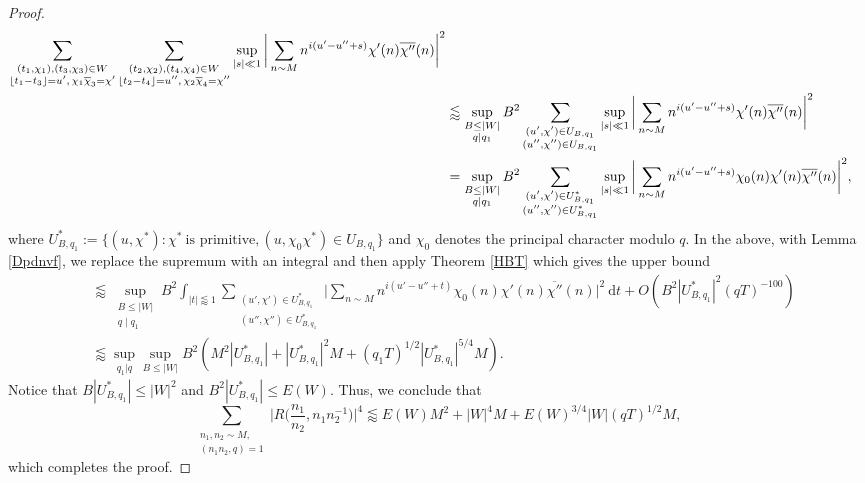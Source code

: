 \documentclass[12pt]{amsart}
\theoremstyle{definition}
\theoremstyle{plain}
\theoremstyle{remark}
\numberwithin{equation}{section}
\numberwithin{theorem}{section}
\numberwithin{equation}{section}
\begin{document}
\begin{proof}
\begin{align}
			\sum_{\substack{(t_{1}, \chi_{1}), (t_{3}, \chi_{3}) \in W \\ \lfloor t_{1}-t_{3} \rfloor =u', \, \chi_{1}\overline{\chi}_{3}=\chi'}}
			\sum_{\substack{(t_{2}, \chi_{2}), (t_{4}, \chi_{4}) \in W \\ \lfloor t_{2}-t_{4} \rfloor =u'', \, \chi_{2}\overline{\chi}_{4}=\chi''}}
			\sup_{|s|\ll 1}
			\bigg|\sum_{n \sim M} n^{i(u'-u''+s)}\chi'(n)\overline{\chi''}(n)\bigg|^{2} \notag
			\\
			&\lessapprox  \sup_{\substack{B \leq |W| \\ q \mid q_1}}B^{2}\sum_{\substack{(u' , \chi') \in U_{B, q_{1}} \\ (u'', \chi'')\in U_{B, q_{1}}}}
			\sup_{|s|\ll 1}
			\bigg|\sum_{n \sim M} n^{i(u'-u''+s)}\chi'(n)\overline{\chi''}(n)\bigg|^{2} \notag
			\\
			&=  \sup_{\substack{B \leq |W| \\ q \mid q_1}}B^{2}\sum_{\substack{(u' , \chi') \in U^{*}_{B, q_{1}} \\ (u'', \chi'')\in U^{*}_{B, q_{1}}}}
			\sup_{|s|\ll 1}
			\bigg|\sum_{n \sim M} n^{i(u'-u''+s)}\chi_{0}(n)\chi'(n)\overline{\chi''}(n)\bigg|^{2} \notag,
		\end{align}
		where $U^{*}_{B,q_{1}}:= \{(u, \chi^{*}): \chi^{*} \ \text{is primitive}, (u, \chi_{0}\chi^{*}) \in U_{B, q_{1}} \}$ and $\chi_0$ denotes the principal character modulo $q$.
		In the above, with Lemma \ref{Dpdnvf}, we replace the supremum with an integral and then apply Theorem \ref{HBT} which gives the upper bound
		\begin{align*}
			&\lessapprox \sup_{\substack{B \leq |W| \\ q \mid q_1}}B^{2}\int_{|t|\lessapprox 1}\sum_{\substack{(u' , \chi') \in U^{*}_{B,q_{1}} \\ (u'', \chi'')\in U^{*}_{B,q_{1}}}}
			\bigg|\sum_{n \sim M} n^{i(u'-u''+t)}\chi_{0}(n)\chi'(n)\overline{\chi''}(n)\bigg|^{2} \: \mathrm{d}t+O(B^2|U^{*}_{B,q_{1}}|^{2}(qT)^{-100}) 
			\\
			&\lessapprox \sup_{q_{1}|q}\sup_{B \leq |W|}B^{2}(M^{2}|U^{*}_{B,q_{1}}|+|U^{*}_{B,q_{1}}|^{2}M+(q_{1}T)^{1/2}|U^{*}_{B,q_{1}}|^{5/4}M ).
		\end{align*}
		Notice that $B|U^{*}_{B,q_{1}}|\leq |W|^{2}$ and $B^{2}|U^{*}_{B,q_{1}}|\leq E(W)$. Thus, we conclude that
		\[\sum_{\substack{n_1,n_2 \sim M, \\ (n_1n_2, q)=1}}\bigg|R\bigg(\frac{n_{1}}{n_{2}}, n_{1}n_{2}^{-1}\bigg)\bigg|^{4} \lessapprox   E(W)M^{2}+ |W|^{4}M+ E(W)^{3/4}|W|(qT)^{1/2}M,\]
		which completes the proof.
	\end{proof}
	
\end{document}
